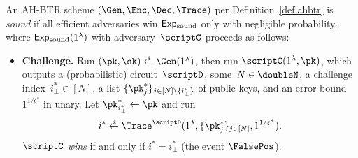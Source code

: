 \begin{definition}[soundness]\label{def:soundness}
An AH-BTR scheme $(\Gen,\Enc,\Dec,\Trace)$ per Definition~\ref{def:ahbtr} is \emph{sound}
if all efficient adversaries win $\ExpSound$ only with negligible probability,
where $\ExpSound(1^\lambda)$ with adversary~$\scriptC$ proceeds as follows:
\begin{itemize}\upshape
\item\textbf{Challenge.}
Run ${(\pk,\sk)\draws\Gen(1^\lambda)}$,
then run $\scriptC(1^\lambda,\pk)$, which outputs
a (probabilistic) circuit~$\scriptD$,
some~${N\in\doubleN}$,
a challenge index~${i_\bot^\ast\in[N]}$,
a list $\{\pk^\ast_j\}_{j\in[N]\setminus\{i_\bot^\ast\}}$ of public keys, and
an error bound $1^{1/\epsilon^\ast}$ in unary.
Let ${\pk^\ast_{i_\bot^\ast}\gets\pk}$ and run
\begin{align*}
i^\ast\draws\Trace^\scriptD(1^\lambda,\{\pk^\ast_j\}_{j\in[N]},1^{1/\epsilon^\ast}).
\end{align*}
$\scriptC$ \emph{wins} if and only if ${i^\ast=i_\bot^\ast}$
(the event $\FalsePos$).
\end{itemize}
\end{definition}
